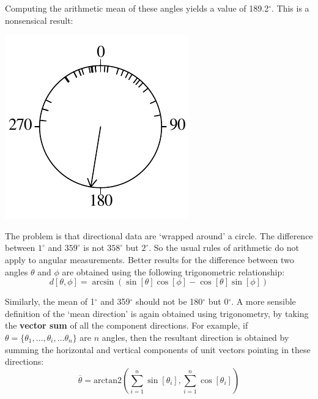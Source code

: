 Computing the arithmetic mean of these angles yields a value of
189.2$^{\circ}$. This is a nonsensical result:

\noindent\begin{minipage}[t][][b]{.25\textwidth}
\includegraphics[]{../figures/circle2.pdf}\medskip
\end{minipage}
\begin{minipage}[t][][t]{.75\textwidth}
  \label{fig:circle2}
\end{minipage}

The problem is that directional data are `wrapped around' a circle.
The difference between $1^{\circ}$ and $359^{\circ}$ is not
$358^{\circ}$ but $2^{\circ}$. So the usual rules of arithmetic do not
apply to angular measurements. Better results for the difference
between two angles $\theta$ and $\phi$ are obtained using the
following trigonometric relationship:
\begin{equation}
  d[\theta,\phi] =
  \arcsin\left( \sin[\theta] \cos[\phi] -
  \cos[\theta] \sin[\phi] \right)
  \label{eq:anglediff}
\end{equation}

Similarly, the mean of 1$^\circ$ and 359$^\circ$ should not be
180$^\circ$ but 0$^\circ$. A more sensible definition of the `mean
direction' is again obtained using trigonometry, by taking the
\textbf{vector sum} of all the component directions. For example, if
$\theta = \{\theta_1, \ldots, \theta_i, \ldots \theta_n \}$ are $n$
angles, then the resultant direction is obtained by summing the
horizontal and vertical components of unit vectors pointing in these
directions:
\begin{equation}
  \overline{\theta} = \mbox{arctan2}\left(
  \sum_{i=1}^{n}\sin[\theta_i],\sum_{i=1}^{n}\cos[\theta_i]
  \right)
  \label{eq:averagedirection}
\end{equation}


